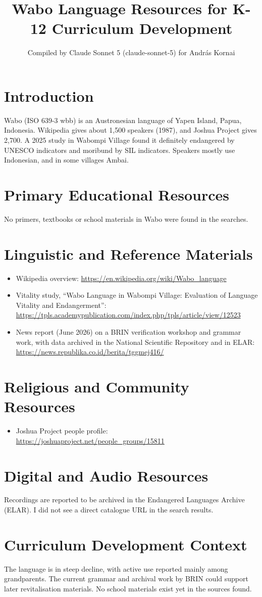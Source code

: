 \documentclass[12pt]{article}
\title{Wabo Language Resources for K-12 Curriculum Development}
\author{Compiled by Claude Sonnet 5 (claude-sonnet-5) for Andr\'as Kornai}
\date{}
\begin{document}
\maketitle
\section{Introduction}
Wabo (ISO 639-3 wbb) is an Austronesian language of Yapen Island, Papua, Indonesia. Wikipedia gives about 1,500 speakers (1987), and Joshua Project gives 2,700. A 2025 study in Wabompi Village found it definitely endangered by UNESCO indicators and moribund by SIL indicators. Speakers mostly use Indonesian, and in some villages Ambai.
\section{Primary Educational Resources}
No primers, textbooks or school materials in Wabo were found in the searches.
\section{Linguistic and Reference Materials}
\begin{itemize}
\item Wikipedia overview: \url{https://en.wikipedia.org/wiki/Wabo_language}
\item Vitality study, ``Wabo Language in Wabompi Village: Evaluation of Language Vitality and Endangerment'': \url{https://tpls.academypublication.com/index.php/tpls/article/view/12523}
\item News report (June 2026) on a BRIN verification workshop and grammar work, with data archived in the National Scientific Repository and in ELAR: \url{https://news.republika.co.id/berita/tggmej416/}
\end{itemize}
\section{Religious and Community Resources}
\begin{itemize}
\item Joshua Project people profile: \url{https://joshuaproject.net/people_groups/15811}
\end{itemize}
\section{Digital and Audio Resources}
Recordings are reported to be archived in the Endangered Languages Archive (ELAR). I did not see a direct catalogue URL in the search results.
\section{Curriculum Development Context}
The language is in steep decline, with active use reported mainly among grandparents. The current grammar and archival work by BRIN could support later revitalisation materials. No school materials exist yet in the sources found.
\end{document}
